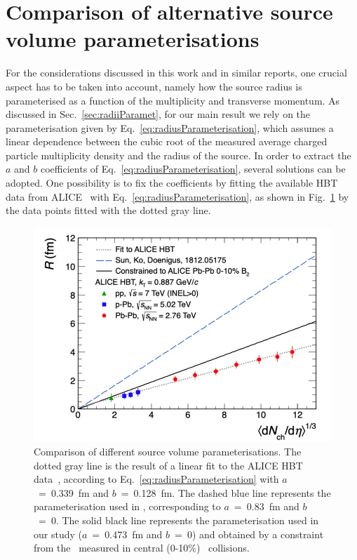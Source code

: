 \documentclass[%
 reprint,
 amsmath,amssymb,
 aps,
]{revtex4-1}
\begin{document}
\appendix
\section{Comparison of alternative source volume parameterisations} \label{appendixA} 
For the considerations discussed in this work and in similar reports, one crucial aspect has to be taken into account, namely how the source radius is parameterised as a function of the multiplicity and transverse momentum.
As discussed in Sec.~\ref{sec:radiiParamet}, for our main result we rely on the parameterisation given by Eq.~\ref{eq:radiusParameterisation}, which assumes a linear dependence between the cubic root of the measured average charged particle multiplicity density and the radius of the source. 
In order to extract the $a$ and $b$ coefficients of Eq.~\ref{eq:radiusParameterisation}, several solutions can be adopted. 
One possibility is to fix the coefficients by fitting the available HBT data from ALICE~\cite{Adam:2015vna, Adam:2015pya, Abelev:2012sq} with Eq.~\ref{eq:radiusParameterisation}, as shown in Fig.~\ref{fig:sourceVolume} by the data points fitted with the dotted gray line. 
%
\begin{figure}[!h]
	\begin{center}
		\includegraphics[width=\columnwidth]{HbtRadiusParam.png}
		\caption{Comparison of different source volume parameterisations. The dotted gray line is the result of a linear fit to the ALICE HBT data~\cite{Adam:2015vna, Adam:2015pya, Abelev:2012sq}, according to Eq.~\ref{eq:radiusParameterisation} with $a$~=~0.339~fm and $b$~=~0.128~fm.  
		The dashed blue line represents the parameterisation used in \cite{Sun:2018mqq}, corresponding to $a$~=~0.83~fm and $b$~=~0.
		The solid black line represents the parameterisation used in our study ($a$~=~0.473~fm and $b$~=~0) and obtained by a constraint from the \btwo~measured in central (0-10$\%$) \PbPb~collisions.}
		\label{fig:sourceVolume}
	\end{center}
\end{figure}
\end{document}
